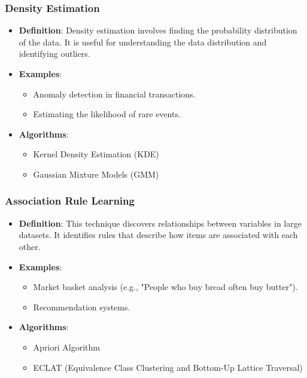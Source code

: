 \subsubsection*{Density Estimation}
\begin{itemize}
    \item \textbf{Definition}: Density estimation involves finding the probability distribution of the data. It is useful for understanding the data distribution and identifying outliers.
    \item \textbf{Examples}:
    \begin{itemize}
        \item Anomaly detection in financial transactions.
        \item Estimating the likelihood of rare events.
    \end{itemize}
    \item \textbf{Algorithms}:
    \begin{itemize}
        \item Kernel Density Estimation (KDE)
        \item Gaussian Mixture Models (GMM)
    \end{itemize}
\end{itemize}

\subsubsection*{Association Rule Learning}
\begin{itemize}
    \item \textbf{Definition}: This technique discovers relationships between variables in large datasets. It identifies rules that describe how items are associated with each other.
    \item \textbf{Examples}:
    \begin{itemize}
        \item Market basket analysis (e.g., "People who buy bread often buy butter").
        \item Recommendation systems.
    \end{itemize}
    \item \textbf{Algorithms}:
    \begin{itemize}
        \item Apriori Algorithm
        \item ECLAT (Equivalence Class Clustering and Bottom-Up Lattice Traversal)
    \end{itemize}
\end{itemize}

